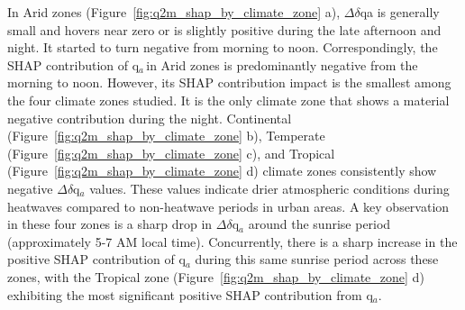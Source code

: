 In Arid zones (Figure~\ref{fig:q2m_shap_by_climate_zone} a), \ensuremath{\Delta }\ensuremath{\delta }qa is generally small and hovers near zero or is slightly positive during the late afternoon and night. It started to turn negative from morning to noon. Correspondingly, the SHAP contribution of q\ensuremath{_{a\ }}in Arid zones is predominantly negative from the morning to noon. However, its SHAP contribution impact is the smallest among the four climate zones studied. It is the only climate zone that shows a material negative contribution during the night. Continental (Figure~\ref{fig:q2m_shap_by_climate_zone} b), Temperate (Figure~\ref{fig:q2m_shap_by_climate_zone} c), and Tropical (Figure~\ref{fig:q2m_shap_by_climate_zone} d) climate zones consistently show negative \ensuremath{\Delta }\ensuremath{\delta }q\ensuremath{_{a}} values. These values indicate drier atmospheric conditions during heatwaves compared to non-heatwave periods in urban areas. A key observation in these four zones is a sharp drop in \ensuremath{\Delta }\ensuremath{\delta }q\ensuremath{_{a}} around the sunrise period (approximately 5-7 AM local time). Concurrently, there is a sharp increase in the positive SHAP contribution of q\ensuremath{_{a}} during this same sunrise period across these zones, with the Tropical zone (Figure~\ref{fig:q2m_shap_by_climate_zone} d) exhibiting the most significant positive SHAP contribution from q\ensuremath{_{a}}.


\bgroup
{}
\begin{figure*}[!htbp]
\centering \makeatletter{}
\makeatother 
\caption{{\textbf{Diurnal cycle of 2-m specific humidity SHAP contributions and feature differences across distinct climate zones.} The hourly SHAP contributions of 2-m specific humidity (\ensuremath{\Delta }\ensuremath{\delta }q\ensuremath{_{a)\ }}to the \ensuremath{\Delta }UHI (bars, \ensuremath{^\circ}C, left y-axis) alongside the \ensuremath{\Delta }\ensuremath{\delta }q\ensuremath{_{a}} (line with markers, kg/kg , right y-axis). These relationships are presented for four different climate zones: (a) Arid, (b) Continental, (c) Temperate, and (d) Tropical.}}
\label{fig:q2m_shap_by_climate_zone}
\end{figure*}
\egroup 
